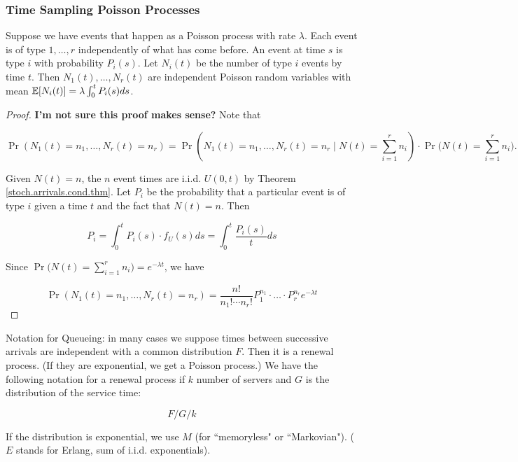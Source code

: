 \subsubsection{Time Sampling Poisson Processes}

\begin{proposition}\label{stoch.ross.prop.5.3} Suppose we have events that happen as a Poisson process with rate \(\lambda\). Each event is of type \(1, \ldots, r\) independently of what has come before. An event at time \(s\) is type \(i\) with probability \(P_i(s) \). Let \(N_i(t)\) be the number of type \(i\) events by time \(t\). Then \(N_1(t), \ldots, N_r(t)\) are independent Poisson random variables with mean \(\E[N_i(t)] = \lambda \int_0^t P_i(s) ds\).

\end{proposition}

\begin{proof} \textbf{I'm not sure this proof makes sense?} Note that

\[
\Pr(N_1(t) = n_1, \ldots, N_r(t) = n_r) = \Pr(N_1(t) = n_1,  \ldots, N_r(t) = n_r \mid N(t) = \sum_{i=1}^r n_i)  \cdot \Pr \bigg( N(t) = \sum_{i=1}^r n_i \bigg) .
\]

Given \(N(t) = n\), the \(n\) event times are i.i.d. \(U(0,t)\) by Theorem \ref{stoch.arrivals.cond.thm}. Let \(P_i\) be the probability that a particular event is of type \(i\) given a time \(t\) and the fact that \(N(t) = n\). Then

\[
P_i  = \int_0^t P_i(s) \cdot f_U(s) ds = \int_0^t \frac{P_i(s)}{t} ds
\]

Since \( \Pr \bigg( N(t) = \sum_{i=1}^r n_i \bigg) = e^{-\lambda t}\), we have

\[
\Pr(N_1(t) = n_1, \ldots, N_r(t) = n_r) = \frac{n!}{n_1! \cdots n_r!} P_1^{n_1} \cdot \ldots \cdot P_r^{n_r} e^{-\lambda t}
\]

\end{proof}

\begin{remark} Notation for Queueing: in many cases we suppose times between successive arrivals are independent with a common distribution \(F\). Then it is a renewal process. (If they are exponential, we get a Poisson process.) We have the following notation for a renewal process if \(k\) number of servers and \(G\) is the distribution of the service time:

\[
F  / G / k
\]

If the distribution is exponential, we use \(M\) (for ``memoryless" or ``Markovian"). (\(E\) stands for Erlang, sum of i.i.d. exponentials).
\end{remark}

